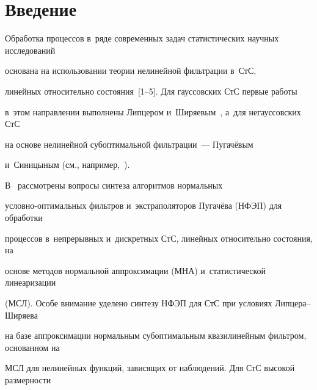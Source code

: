 




\vspace*{-6pt}



















      \thispagestyle{headings}








\section{Введение}





Обработка процессов в~ряде современных задач статистических научных исследований 


основана на использовании теории нелинейной фильтрации в~СтС, 


линейных относительно состояния~[1--5]. Для гауссовских СтС первые работы 


в~этом направлении выполнены Липцером и~Ширяевым~\cite{1-sin}, а~для негауссовских СтС  


на основе нелинейной субоптимальной фильтрации~--- Пугачёвым 


и~Синицыным (см., например,~\cite{2-sin}).


В~\cite{3-sin, 4-sin} рассмотрены вопросы синтеза алгоритмов нормальных 


услов\-но-оп\-ти\-маль\-ных фильтров и~экстраполяторов Пугачёва (НФЭП) для обработки 


процессов в~непрерывных и~дискретных СтС, линейных относительно состояния, на 


основе методов нормальной аппроксимации (МНА) и~статистической линеаризации 


(МСЛ).  Особе внимание уделено синтезу НФЭП для СтС при условиях Лип\-це\-ра--Ши\-ря\-ева


 на базе аппроксимации нормальным субоптимальным квазилинейным фильтром, основанном на 


 МСЛ для нелинейных функций, зависящих от наблюдений. Для СтС высокой размерности  


